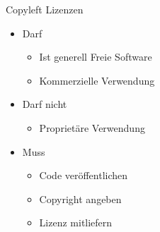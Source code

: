 \begin{frame}{Copyleft Lizenzen}
	\begin{itemize}
		\item Darf
		\begin{itemize}
			\item Ist generell Freie Software
			\item Kommerzielle Verwendung
		\end{itemize}
		\item Darf nicht
		\begin{itemize}
			\item Proprietäre Verwendung
		\end{itemize}
		\item Muss
		\begin{itemize}
			\item Code veröffentlichen
			\item Copyright angeben
			\item Lizenz mitliefern
		\end{itemize}
	\end{itemize}
\end{frame}


